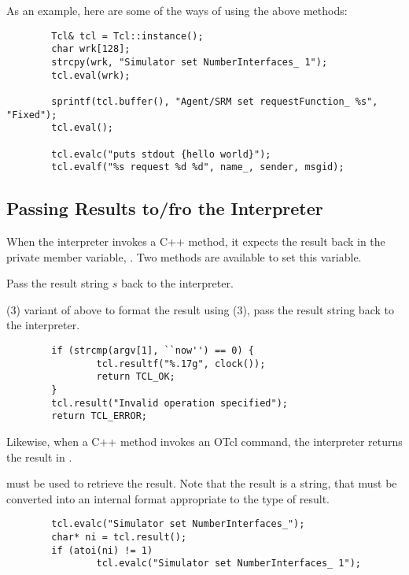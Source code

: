 \documentclass{article}
\begin{document}
As an example, here are some of the ways of using the above methods:
\begin{verbatim}
        Tcl& tcl = Tcl::instance();
        char wrk[128];
        strcpy(wrk, "Simulator set NumberInterfaces_ 1");
        tcl.eval(wrk);

        sprintf(tcl.buffer(), "Agent/SRM set requestFunction_ %s", "Fixed");
        tcl.eval();
                
        tcl.evalc("puts stdout {hello world}");
        tcl.evalf("%s request %d %d", name_, sender, msgid);
\end{verbatim}

\subsection{Passing Results to/fro the Interpreter}
\label{sec:Result}

When the interpreter invokes a C++ method,
it expects the result back in the private member variable,
.
Two methods are available to set this variable.
\begin{list}{\textbullet}{}
\item {}

        Pass the result string $s$ back to the interpreter.
\item

        (3) variant of above
        to format the result using (3),
        pass the result string back to the interpreter.
\end{list}
\begin{verbatim}
        if (strcmp(argv[1], ``now'') == 0) {
                tcl.resultf("%.17g", clock());
                return TCL_OK;
        }
        tcl.result("Invalid operation specified");
        return TCL_ERROR;
\end{verbatim}

Likewise, when a C++ method invokes an OTcl command,
the interpreter returns the result in .
\begin{list}{\textbullet}{}
\item {}
      must be used to retrieve the result.
      Note that the result is a string, that must be converted
      into an internal format appropriate to the type of result.
\end{list}
\begin{verbatim}
        tcl.evalc("Simulator set NumberInterfaces_");
        char* ni = tcl.result();
        if (atoi(ni) != 1)
                tcl.evalc("Simulator set NumberInterfaces_ 1");
\end{verbatim}
        
\end{document}
